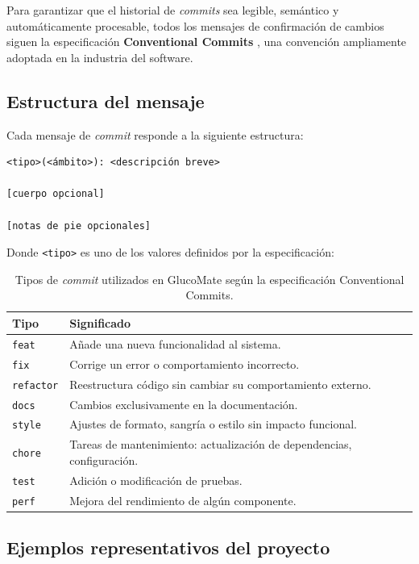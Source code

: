 Para garantizar que el historial de \textit{commits} sea legible, semántico y
automáticamente procesable, todos los mensajes de confirmación de cambios siguen la
especificación \textbf{Conventional Commits} \cite{conventionalcommits}, una convención
ampliamente adoptada en la industria del software.

\subsection{Estructura del mensaje}

Cada mensaje de \textit{commit} responde a la siguiente estructura:

\begin{verbatim}
<tipo>(<ámbito>): <descripción breve>

[cuerpo opcional]

[notas de pie opcionales]
\end{verbatim}

\noindent Donde \texttt{<tipo>} es uno de los valores definidos por la especificación:

\begin{table}[H]
\centering
\caption{Tipos de \textit{commit} utilizados en GlucoMate según la especificación
         Conventional Commits.}
\label{tab:commit-types}
\begin{tabular}{|l|p{9.5cm}|}
\hline
\textbf{Tipo} & \textbf{Significado} \\
\hline
\texttt{feat}     & Añade una nueva funcionalidad al sistema. \\
\texttt{fix}      & Corrige un error o comportamiento incorrecto. \\
\texttt{refactor} & Reestructura código sin cambiar su comportamiento externo. \\
\texttt{docs}     & Cambios exclusivamente en la documentación. \\
\texttt{style}    & Ajustes de formato, sangría o estilo sin impacto funcional. \\
\texttt{chore}    & Tareas de mantenimiento: actualización de dependencias, configuración. \\
\texttt{test}     & Adición o modificación de pruebas. \\
\texttt{perf}     & Mejora del rendimiento de algún componente. \\
\hline
\end{tabular}
\end{table}

\subsection{Ejemplos representativos del proyecto}

